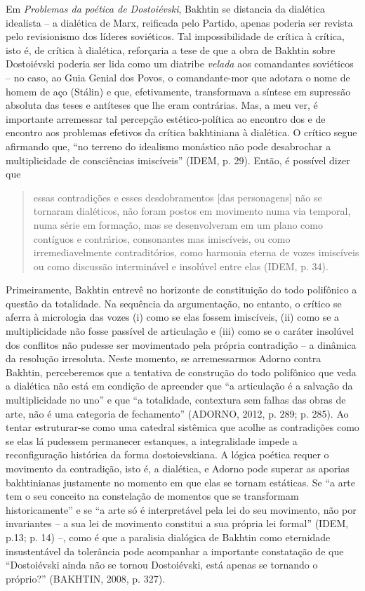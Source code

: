 Em \emph{Problemas da poética de Dostoiévski}, Bakhtin se distancia da
dialética idealista -- a dialética de Marx, reificada pelo Partido,
apenas poderia ser revista pelo revisionismo dos líderes soviéticos. Tal
impossibilidade de crítica à crítica, isto é, de crítica à dialética,
reforçaria a tese de que a obra de Bakhtin sobre Dostoiévski poderia ser
lida como um diatribe \emph{velada} aos comandantes soviéticos -- no
caso, ao Guia Genial dos Povos, o comandante-mor que adotara o nome de
homem de aço (Stálin) e que, efetivamente, transformava a síntese em
supressão absoluta das teses e antíteses que lhe eram contrárias. Mas, a
meu ver, é importante arremessar tal percepção estético-política ao
encontro dos e de encontro aos problemas efetivos da crítica bakhtiniana
à dialética. O crítico segue afirmando que, ``no terreno do idealismo
monástico não pode desabrochar a multiplicidade de consciências
imiscíveis'' (IDEM, p. 29). Então, é possível dizer que

\begin{quote}
essas contradições e esses desdobramentos {[}das personagens{]} não se
tornaram dialéticos, não foram postos em movimento numa via temporal,
numa série em formação, mas se desenvolveram em um plano como contíguos
e contrários, consonantes mas imiscíveis, ou como irremediavelmente
contraditórios, como harmonia eterna de vozes imiscíveis ou como
discussão interminável e insolúvel entre elas (IDEM, p. 34).
\end{quote}

Primeiramente, Bakhtin entrevê no horizonte de constituição do todo
polifônico a questão da totalidade. Na sequência da argumentação, no
entanto, o crítico se aferra à micrologia das vozes (i) como se elas
fossem imiscíveis, (ii) como se a multiplicidade não fosse passível de
articulação e (iii) como se o caráter insolúvel dos conflitos não
pudesse ser movimentado pela própria contradição -- a dinâmica da
resolução irresoluta. Neste momento, se arremessarmos Adorno contra
Bakhtin, perceberemos que a tentativa de construção do todo polifônico
que veda a dialética não está em condição de apreender que ``a
articulação é a salvação da multiplicidade no uno'' e que ``a
totalidade, contextura sem falhas das obras de arte, não é uma categoria
de fechamento'' (ADORNO, 2012, p. 289; p. 285). Ao tentar estruturar-se
como uma catedral sistêmica que acolhe as contradições como se elas lá
pudessem permanecer estanques, a integralidade impede a reconfiguração
histórica da forma dostoievskiana. A lógica poética requer o movimento
da contradição, isto é, a dialética, e Adorno pode superar as aporias
bakhtinianas justamente no momento em que elas se tornam estáticas. Se
``a arte tem o seu conceito na constelação de momentos que se
transformam historicamente'' e se ``a arte só é interpretável pela lei
do seu movimento, não por invariantes -- a sua lei de movimento
constitui a sua própria lei formal'' (IDEM, p.13; p. 14) --, como é que
a paralisia dialógica de Bakhtin como eternidade insustentável da
tolerância pode acompanhar a importante constatação de que ``Dostoiévski
ainda não se tornou Dostoiévski, está apenas se tornando o próprio?''
(BAKHTIN, 2008, p. 327).

